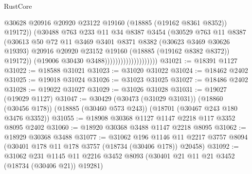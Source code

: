 \begin{lexlean}{RustCore}
\begin{coremodule}
                                            @30628
                                            @20916
                                            @20920
                                            @23122
                                            @19160
                                            (@18885 (@19162 @8361 @8352))
                                            @19172))
                                        (@30488
                                          @763
                                          @233
                                          @11
                                          @34
                                          @8387
                                          @3454
                                          (@30529
                                            @763
                                            @11
                                            @8387
                                            (@30613
                                              @50
                                              @72
                                              @11
                                              @3469
                                              @3401
                                              @8371
                                              @8382
                                              (@30623 @3469 @30626 @19393)
                                              @20916
                                              @20920
                                              @23152
                                              @19160
                                              (@18885 (@19162 @8382 @8372))
                                              @19172))
                                          (@19006 @30430 @3488))))))))))))))))))))
@31021 := @18391 @1127
@31022 := @18588 @31021
@31023 := @31020 @31022
@31024 := @18462 @2402
@31025 := @19018 @31024
@31026 := @31023 @31025
@31027 := @18486 @2402
@31028 := @19022 @31027
@31029 := @31026 @31028
@31031 := @19027 (@19029 @1127)
@31047 := @30429
    (@30473 (@31029 @31031))
    (@18860 (@30456 @178))
    (@18885 (@30460 @573 @243))
    (@18701 (@30467 @243 @180 @3476 @3352))
@31055 := @18908 @30368 @1127 @1147 @2218 @117 @3352 @8095 @2402
@31060 := @18920 @30368 @3488 @1147 @2218 @8095
@31062 := @18929 @30368 @3488
@31077 := @31062
    @196
    @1146
    @11
    @2217
    @3757
    @8094
    (@30401 @178 @11 @178 @3757 (@18734 (@30406 @178)) @20458)
@31092 := @31062
    @231
    @1145
    @11
    @2216
    @3452
    @8093
    (@30401 @21 @11 @21 @3452 (@18734 (@30406 @21)) @19281)

\end{coremodule}
\end{lexlean}
